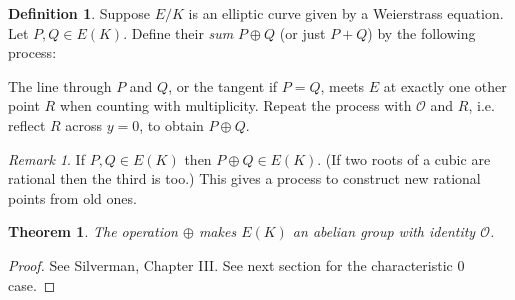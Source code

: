\documentclass[a4paper]{article}
\theoremstyle{plain}
\newtheorem{theorem}{Theorem}
\theoremstyle{remark}
\newtheorem*{remark}{Remark}
\theoremstyle{definition}
\newtheorem*{definition}{Definition}
\renewcommand{\O}{\mathcal{O}}
\begin{document}
\begin{definition}
    Suppose $E/K$ is an elliptic curve given by a Weierstrass equation. Let
    $P,Q\in E(K)$. Define their \emph{sum} $P\oplus Q$ (or just $P+Q$) by the
    following process:
    \begin{figure}[htb]
        \centering
    \end{figure}

    The line through $P$ and $Q$, or the tangent if $P=Q$, meets $E$ at exactly
    one other point $R$ when counting with multiplicity. Repeat the process with
    $\O$ and $R$, i.e. reflect $R$ across $y=0$, to obtain $P\oplus Q$.
\end{definition}

\begin{remark}
    If $P,Q\in E(K)$ then $P\oplus Q\in E(K)$. (If two roots of a cubic are
    rational then the third is too.) This gives a process to construct new
    rational points from old ones.
\end{remark}

\begin{theorem}
    The operation $\oplus$ makes $E(K)$ an abelian group with identity $\O$.
\end{theorem}

\begin{proof}
    See Silverman, Chapter III. See next section for the characteristic 0 case.
\end{proof}
\end{document}

